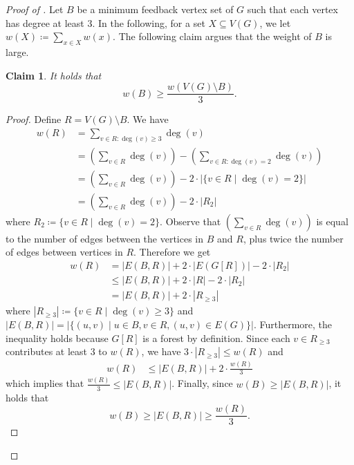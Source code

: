 \documentclass[letterpaper,11pt]{article}
\newenvironment{claimproof}{\begin{proof}\renewcommand{\qedsymbol}{$\lrcorner$}}{\end{proof}}
\newcommand{\abs}[1]{{\left| #1\right|}}
\newcommand{\1}[1]{\mathds{1}\left[#1\right]}
\newtheorem{claim}[theorem]{Claim}
\begin{document}
\begin{proof}[Proof of ]
	Let $B$ be a minimum feedback vertex set of $G$ such that each vertex has degree
	at least 3.
	In the following, for a set $X \subseteq V(G)$, we let $w(X) \coloneqq \sum_{x \in X} w(x)$.	
	The following claim argues that
	the weight of $B$ is large.
	\begin{claim}\label{claim:B_weight_large}
		It holds that
		\begin{equation*}
			w(B) \geq \frac{w\left( V(G) \setminus B \right)}{3}.
		\end{equation*}
	\end{claim}

	\begin{claimproof}
		Define $R = V(G) \setminus B$. We have
		\begin{align*}
			w(R) &= \sum_{v \in R \colon \deg(v) \geq 3} \deg(v)\\
			     &= \left( \sum_{v \in R} \deg(v) \right)  - \left( \sum_{v \in R \colon \deg(v) = 2} \deg(v) \right) \\
			     &= \left( \sum_{v \in R} \deg(v) \right) - 2 \cdot \abs{\{v \in R \mid \deg(v) = 2\} }\\
			     &= \left( \sum_{v \in R} \deg(v) \right) - 2 \cdot \abs{R_2}
		\end{align*}
		where $R_2 \coloneqq \{v \in R \mid \deg(v) = 2\}$. Observe that $\left( \sum_{v \in R} \deg(v) \right)$
		is equal to the number of edges between the vertices in $B$ and $R$,
		plus twice the number of edges between vertices in $R$.
		Therefore we get
		\begin{align*}
			w(R) &= \abs{E(B,R)} + 2 \cdot \abs{E(G[R])} - 2 \cdot \abs{R_2}\\
			     &\leq \abs{E(B,R)} + 2 \cdot \abs{R} - 2 \cdot \abs{R_2}\\
			     &= \abs{E(B,R)} + 2 \cdot \abs{R_{\geq 3}} 
		\end{align*}
		where $\abs{R_{\geq 3}} \coloneqq \{v \in R \mid \deg(v) \geq 3\}$
		and $\abs{E(B,R)} = \abs{\{(u,v) \mid u \in B, v \in R, (u,v) \in E(G)\}}$.
		Furthermore, the inequality holds because $G[R]$ is a forest by definition.
		Since each $v \in R_{\geq 3}$ contributes at least 3 to
		$w(R)$, we have $3\cdot \abs{R_{\geq 3}} \leq w(R)$ and
		\begin{align*}
			w(R) &\leq \abs{E(B,R)} + 2 \cdot \frac{w(R)}{3}
		\end{align*}
		which implies that $\frac{w(R)}{3} \leq \abs{E(B,R)}$.
		Finally, since $w(B) \geq \abs{E(B,R)}$, it holds that
		\begin{equation*}
			w(B) \geq \abs{E(B,R)} \geq \frac{w(R)}{3}.
		\end{equation*}
	\end{claimproof}


\end{proof}
\end{document}
